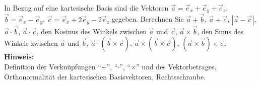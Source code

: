 \begin{question}[section=1,subsection=12,name={Elementare Vektoralgebra},difficulty=3,type=bsp,mode=skp,tags={20110509}]
In Bezug auf eine kartesische Basis sind die Vektoren
$\vec a = \vec e_x + \vec e_y + \vec e_z$, $\vec b = \vec e_x - \vec e_y$, $\vec c = \vec e_x + 2 \vec e_y - 2 \vec e_z$ 
gegeben. Berechnen Sie $ \vec a + \vec b$, $ \vec a + \vec c$, $| \vec a - \vec c |$, $\vec a \cdot \vec b$, $ \vec a \cdot \vec c$, den Kosinus des Winkels zwischen $\vec a$ und $\vec c$, $ \vec a \times \vec b$, den Sinus des Winkels zwischen $\vec a$ und $\vec b$, $\vec a \cdot (\vec b \times \vec c)$, $\vec a \times ( \vec b \times \vec c)$, $(\vec a \times \vec b ) \times \vec c$.
\\ \textbf{Hinweis:}\\
Definition der Verkn\"upfungen ``+'', ``$\cdot$'', ``$\times$''  und des Vektorbetrages. Orthonormalit\"at der kartesischen Basisvektoren, Rechtsschraube.
\end{question}
